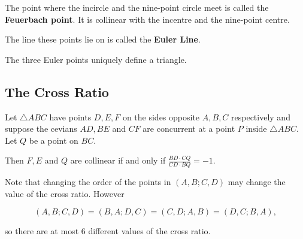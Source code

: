 The point where the incircle and the nine-point circle meet is called the \textbf{Feuerbach point}. It is collinear with the incentre and the nine-point centre.


The line these points lie on is called the \textbf{Euler Line}.


\begin{proposition}
    The three Euler points uniquely define a triangle.
\end{proposition}

\subsection{The Cross Ratio}

\begin{theorem}
    Let \(\triangle ABC\) have points \(D, E, F\) on the sides opposite \(A, B, C\) respectively and suppose the cevians \(AD, BE\) and \(CF\) are concurrent at a point \(P\) inside \(\triangle ABC\). Let \(Q\) be a point on \(BC\).

    Then \(F, E\) and \(Q\) are collinear if and only if \(\displaystyle{\frac{BD \cdot CQ}{CD \cdot BQ} = -1}\).
\end{theorem}


Note that changing the order of the points in \((A, B; C, D)\) may change the value of the cross ratio. However

\[(A, B; C, D) = (B, A; D, C) = (C, D; A, B) = (D, C; B, A),\]

so there are at most 6 different values of the cross ratio.


